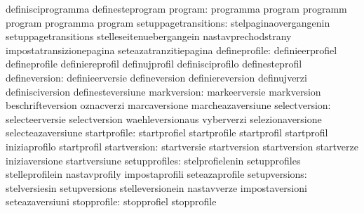                                   definisciprogramma               definesteprogram
                         program: programma                        program
                                  programm                         program
                                  programma                        program
            setuppagetransitions: stelpaginaovergangenin           setuppagetransitions
                                  stelleseitenuebergangein         nastavprechodstrany
                                  impostatransizionepagina         seteazatranzitiepagina
                   defineprofile: definieerprofiel                 defineprofile
                                  definiereprofil                  definujprofil
                                  definisciprofilo                 definesteprofil
                   defineversion: definieerversie                  defineversion
                                  definiereversion                 definujverzi
                                  definisciversion                 definesteversiune
                     markversion: markeerversie                    markversion
                                  beschrifteversion                oznacverzi
                                  marcaversione                    marcheazaversiune %
                   selectversion: selecteerversie                  selectversion
                                  waehleversionaus                 vyberverzi
                                  selezionaversione                selecteazaversiune %
                    startprofile: startprofiel                     startprofile
                                  startprofil                      startprofil
                                  iniziaprofilo                    startprofil
                    startversion: startversie                      startversion
                                  startversion                     startverze
                                  iniziaversione                   startversiune
                   setupprofiles: stelprofielenin                  setupprofiles
                                  stelleprofilein                  nastavprofily
                                  impostaprofili                   seteazaprofile
                   setupversions: stelversiesin                    setupversions
                                  stelleversionein                 nastavverze
                                  impostaversioni                  seteazaversiuni
                     stopprofile: stopprofiel                      stopprofile
